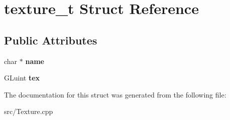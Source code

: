 \hypertarget{structtexture__t}{}\section{texture\+\_\+t Struct Reference}
\label{structtexture__t}
\subsection*{Public Attributes}
\begin{DoxyCompactItemize}
\item 
\hypertarget{structtexture__t_a0a44d52225ea8f0a485404ec6350c21e}{}char $\ast$ {\bfseries name}\label{structtexture__t_a0a44d52225ea8f0a485404ec6350c21e}

\item 
\hypertarget{structtexture__t_afeecfe451c6753eb370af68a54ba4370}{}G\+Luint {\bfseries tex}\label{structtexture__t_afeecfe451c6753eb370af68a54ba4370}

\end{DoxyCompactItemize}


The documentation for this struct was generated from the following file\+:\begin{DoxyCompactItemize}
\item 
src/Texture.\+cpp\end{DoxyCompactItemize}
